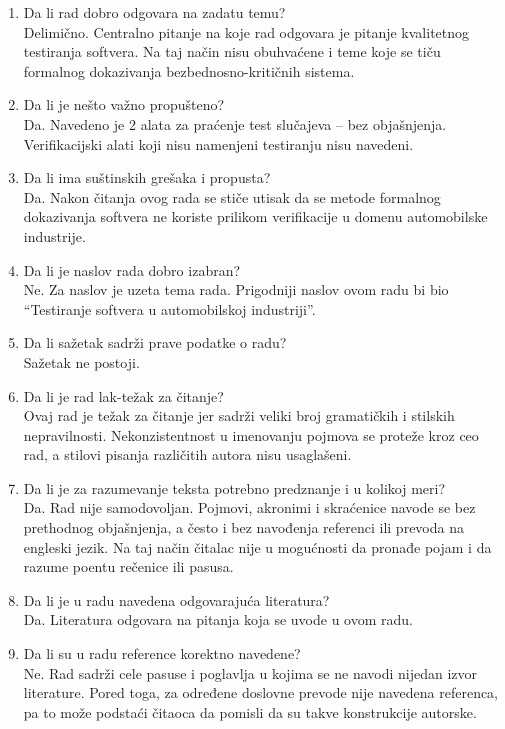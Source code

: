 \documentclass[a4paper]{report}
\begin{document}
\begin{enumerate}
\item Da li rad dobro odgovara na zadatu temu?\\
  Delimično. Centralno pitanje na koje rad odgovara je pitanje kvalitetnog testiranja softvera. Na taj način nisu obuhvaćene i teme koje se tiču formalnog dokazivanja bezbednosno-kritičnih sistema.
\item Da li je nešto važno propušteno?\\
   Da. Navedeno je 2 alata za praćenje test slučajeva -- bez objašnjenja. Verifikacijski alati koji nisu namenjeni testiranju nisu navedeni.
 \item Da li ima suštinskih grešaka i propusta?\\
   Da. Nakon čitanja ovog rada se stiče utisak da se metode formalnog dokazivanja softvera ne koriste prilikom verifikacije u domenu automobilske industrije.
 \item Da li je naslov rada dobro izabran?\\
   Ne. Za naslov je uzeta tema rada. Prigodniji naslov ovom radu bi bio ``Testiranje softvera u automobilskoj industriji''.
 \item Da li sažetak sadrži prave podatke o radu?\\
   Sažetak ne postoji.
 \item Da li je rad lak-težak za čitanje?\\
   Ovaj rad je težak za čitanje jer sadrži veliki broj gramatičkih i stilskih nepravilnosti. Nekonzistentnost u imenovanju pojmova se proteže kroz ceo rad, a stilovi pisanja različitih autora nisu usaglašeni.
 \item Da li je za razumevanje teksta potrebno predznanje i u kolikoj meri?\\
   Da. Rad nije samodovoljan. Pojmovi, akronimi i skraćenice navode se bez prethodnog objašnjenja, a često i bez navođenja referenci ili prevoda na engleski jezik. Na taj način čitalac nije u mogućnosti da pronađe pojam i da razume poentu rečenice ili pasusa.
 \item Da li je u radu navedena odgovarajuća literatura?\\
   Da. Literatura odgovara na pitanja koja se uvode u ovom radu.
 \item Da li su u radu reference korektno navedene?\\
   Ne. Rad sadrži cele pasuse i poglavlja u kojima se ne navodi nijedan izvor literature. Pored toga, za određene doslovne prevode nije navedena referenca, pa to može podstaći čitaoca da pomisli da su takve konstrukcije autorske.

\end{enumerate}
\end{document}

